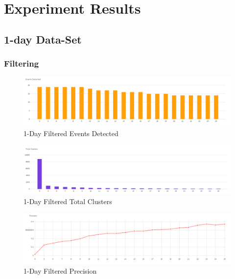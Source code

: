 \documentclass[a4paper,portrait,12pt]{article}
\begin{document}
\newpage
\nocite{*}


\pagebreak

\appendix

\section{Experiment Results}
\label{appendix:results}

\subsection{1-day Data-Set}
\subsubsection{Filtering}

\begin{figure}[H]
	\centering
	\includegraphics[width=\linewidth]{images/1day-filtered-events-detected.png}
	\caption{1-Day Filtered Events Detected}
	\label{fig:1day-filtered-events-detected}
\end{figure}

\begin{figure}[H]
	\centering
	\includegraphics[width=\linewidth]{images/1day-filtered-total-clusters.png}
	\caption{1-Day Filtered Total Clusters}
	\label{fig:1day-filtered-total-clusters}
\end{figure}

\begin{figure}[H]
	\centering
	\includegraphics[width=\linewidth]{images/1day-filtered-precision.png}
	\caption{1-Day Filtered Precision}
	\label{fig:1day-filtered-precision}
\end{figure}
\end{document}
